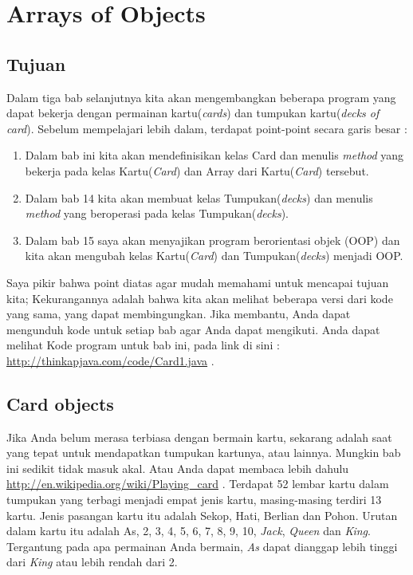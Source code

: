 \documentclass[12pt,b5paper,openright,twoside]{book}
\begin{document}
\chapter{Arrays of Objects}
\section{Tujuan}

Dalam tiga bab selanjutnya kita akan mengembangkan beberapa program yang dapat bekerja dengan permainan kartu(\textit{cards}) dan tumpukan kartu(\textit{decks of card}). Sebelum mempelajari lebih dalam, terdapat point-point secara garis besar :
\begin{enumerate}
 \item Dalam bab ini kita akan mendefinisikan kelas Card dan menulis \textit{method} yang bekerja pada kelas Kartu(\textit{Card}) dan Array dari Kartu(\textit{Card}) tersebut.
  \item Dalam bab 14 kita akan membuat kelas Tumpukan(\textit{decks}) dan menulis \textit{method} yang beroperasi pada kelas Tumpukan(\textit{decks}).
  \item Dalam bab 15 saya akan menyajikan program berorientasi objek (OOP) dan kita akan mengubah kelas Kartu(\textit{Card}) dan Tumpukan(\textit{decks}) menjadi OOP.
\end{enumerate}

Saya pikir bahwa point diatas agar mudah memahami untuk mencapai tujuan kita; Kekurangannya adalah bahwa kita akan melihat beberapa versi dari kode yang sama, yang dapat membingungkan. Jika membantu, Anda dapat mengunduh kode untuk setiap bab agar Anda dapat mengikuti. Anda dapat melihat Kode program untuk bab ini, pada link di sini : \url{http://thinkapjava.com/code/Card1.java} .

\section{Card objects}
Jika Anda belum merasa terbiasa dengan bermain kartu, sekarang adalah saat yang tepat untuk mendapatkan tumpukan kartunya, atau lainnya. Mungkin bab ini sedikit tidak masuk akal. Atau Anda dapat membaca lebih dahulu \url{http://en.wikipedia.org/wiki/Playing_card} .
Terdapat 52 lembar kartu dalam tumpukan yang terbagi menjadi empat jenis kartu, masing-masing terdiri 13 kartu. Jenis pasangan kartu itu adalah Sekop, Hati, Berlian dan Pohon. Urutan dalam kartu itu adalah As, 2, 3, 4, 5, 6, 7, 8, 9, 10, \textit{Jack}, \textit{Queen} dan \textit{King}. Tergantung pada apa permainan Anda bermain, \textit{As} dapat dianggap lebih tinggi dari \textit{King} atau lebih rendah dari 2. \par
\end{document}
